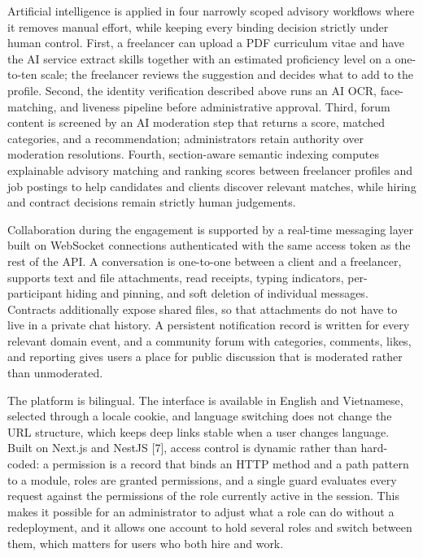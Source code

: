 Artificial intelligence is applied in four narrowly scoped advisory workflows where it removes manual effort, while keeping every binding decision strictly under human control. First, a freelancer can upload a PDF curriculum vitae and have the AI service extract skills together with an estimated proficiency level on a one-to-ten scale; the freelancer reviews the suggestion and decides what to add to the profile. Second, the identity verification described above runs an AI OCR, face-matching, and liveness pipeline before administrative approval. Third, forum content is screened by an AI moderation step that returns a score, matched categories, and a recommendation; administrators retain authority over moderation resolutions. Fourth, section-aware semantic indexing computes explainable advisory matching and ranking scores between freelancer profiles and job postings to help candidates and clients discover relevant matches, while hiring and contract decisions remain strictly human judgements.

Collaboration during the engagement is supported by a real-time messaging layer built on WebSocket connections authenticated with the same access token as the rest of the API. A conversation is one-to-one between a client and a freelancer, supports text and file attachments, read receipts, typing indicators, per-participant hiding and pinning, and soft deletion of individual messages. Contracts additionally expose shared files, so that attachments do not have to live in a private chat history. A persistent notification record is written for every relevant domain event, and a community forum with categories, comments, likes, and reporting gives users a place for public discussion that is moderated rather than unmoderated.

The platform is bilingual. The interface is available in English and Vietnamese, selected through a locale cookie, and language switching does not change the URL structure, which keeps deep links stable when a user changes language. Built on Next.js and NestJS [7], access control is dynamic rather than hard-coded: a permission is a record that binds an HTTP method and a path pattern to a module, roles are granted permissions, and a single guard evaluates every request against the permissions of the role currently active in the session. This makes it possible for an administrator to adjust what a role can do without a redeployment, and it allows one account to hold several roles and switch between them, which matters for users who both hire and work.

